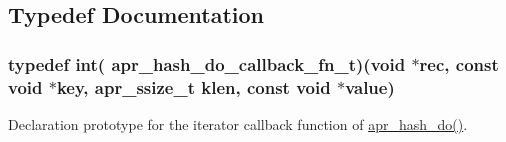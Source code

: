 \subsection{Typedef Documentation}
\hypertarget{group__apr__hash_ga31696b2d87fbc5b626887a59f5ebb7d1}{
\subsubsection[{apr\-\_\-hash\-\_\-do\-\_\-callback\-\_\-fn\-\_\-t}]{\setlength{\rightskip}{0pt plus 5cm}typedef int( apr\-\_\-hash\-\_\-do\-\_\-callback\-\_\-fn\-\_\-t)(void $\ast$rec, const void $\ast$key, apr\-\_\-ssize\-\_\-t klen, const void $\ast$value)}}\label{group__apr__hash_ga31696b2d87fbc5b626887a59f5ebb7d1}
Declaration prototype for the iterator callback function of \hyperlink{group__apr__hash_ga3f3bac64e281d9e7eb9fed6101031394}{apr\-\_\-hash\-\_\-do()}.


